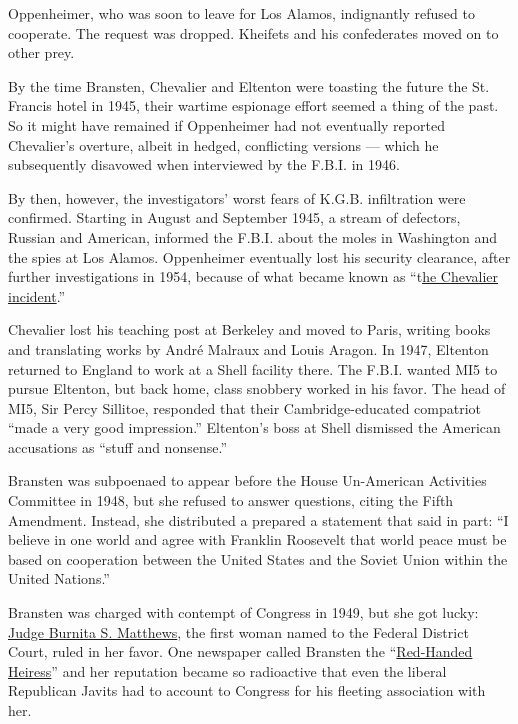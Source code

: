 Oppenheimer, who was soon to leave for Los Alamos, indignantly refused
to cooperate. The request was dropped. Kheifets and his confederates
moved on to other prey.

By the time Bransten, Chevalier and Eltenton were toasting the future
the St. Francis hotel in 1945, their wartime espionage effort seemed a
thing of the past. So it might have remained if Oppenheimer had not
eventually reported Chevalier's overture, albeit in hedged, conflicting
versions --- which he subsequently disavowed when interviewed by the
F.B.I. in 1946.

By then, however, the investigators' worst fears of K.G.B. infiltration
were confirmed. Starting in August and September 1945, a stream of
defectors, Russian and American, informed the F.B.I. about the moles in
Washington and the spies at Los Alamos. Oppenheimer eventually lost his
security clearance, after further investigations in 1954, because of
what became known as
``t\href{http://www.plosin.com/beatbegins/archive/Chevalier.htm}{he
Chevalier incident}.''

Chevalier lost his teaching post at Berkeley and moved to Paris, writing
books and translating works by André Malraux and Louis Aragon. In 1947,
Eltenton returned to England to work at a Shell facility there. The
F.B.I. wanted MI5 to pursue Eltenton, but back home, class snobbery
worked in his favor. The head of MI5, Sir Percy Sillitoe, responded that
their Cambridge-educated compatriot ``made a very good impression.''
Eltenton's boss at Shell dismissed the American accusations as ``stuff
and nonsense.''

Bransten was subpoenaed to appear before the House Un-American
Activities Committee in 1948, but she refused to answer questions,
citing the Fifth Amendment. Instead, she distributed a prepared a
statement that said in part: ``I believe in one world and agree with
Franklin Roosevelt that world peace must be based on cooperation between
the United States and the Soviet Union within the United Nations.''

Bransten was charged with contempt of Congress in 1949, but she got
lucky:
\href{http://www.nytimes3xbfgragh.onion/1988/04/28/obituaries/burnita-s-matthews-dies-at-93-first-woman-on-us-trial-courts.html?mcubz=0}{Judge
Burnita S. Matthews}, the first woman named to the Federal District
Court, ruled in her favor. One newspaper called Bransten the
``\href{https://www.newspapers.com/newspage/174460864/}{Red-Handed
Heiress}'' and her reputation became so radioactive that even the
liberal Republican Javits had to account to Congress for his fleeting
association with her.

